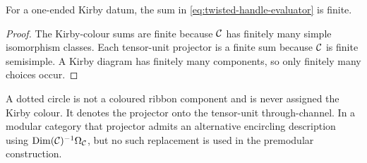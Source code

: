 \begin{proposition}
\label{prop:evaluator-finiteness}
For a one-ended Kirby datum, the sum in
\eqref{eq:twisted-handle-evaluator} is finite.
\end{proposition}

\begin{proof}
The Kirby-colour sums are finite because \(\mathcal{C}\) has finitely many simple
isomorphism classes.  Each tensor-unit projector is a finite sum because
\(\mathcal{C}\) is finite semisimple.  A Kirby diagram has finitely many components,
so only finitely many choices occur.
\end{proof}

\begin{remark}
\label{rem:dotted-circle-operation-scope}
A dotted circle is not a coloured ribbon component and is never assigned the
Kirby colour.  It denotes the projector onto the tensor-unit through-channel.
In a modular category that projector admits an alternative encircling
description using \(\operatorname{Dim}(\mathcal{C})^{-1}\Omega_{\mathcal{C}}\), but no such
replacement is used in the premodular construction.
\end{remark}
